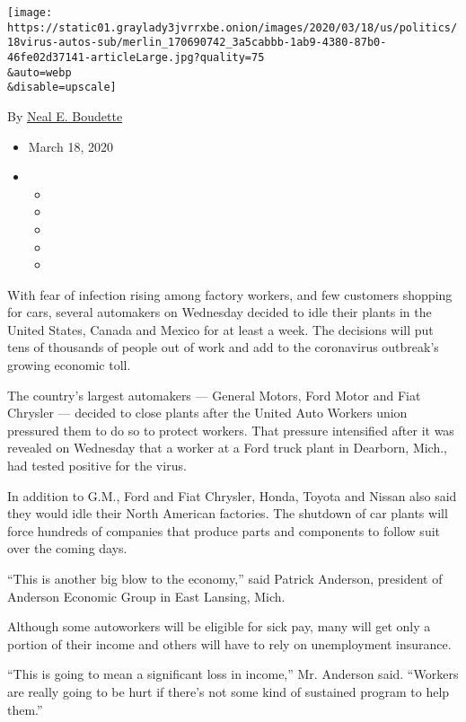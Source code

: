 \texttt{[image: https://static01.graylady3jvrrxbe.onion/images/2020/03/18/us/politics/18virus-autos-sub/merlin\_170690742\_3a5cabbb-1ab9-4380-87b0-46fe02d37141-articleLarge.jpg?quality=75\\\&auto=webp\\\&disable=upscale]}

By \href{https://www.nytimes3xbfgragh.onion/by/neal-e-boudette}{Neal E.
Boudette}

\begin{itemize}
\item
  March 18, 2020
\item
  \begin{itemize}
  \item
  \item
  \item
  \item
  \item
  \end{itemize}
\end{itemize}

With fear of infection rising among factory workers, and few customers
shopping for cars, several automakers on Wednesday decided to idle their
plants in the United States, Canada and Mexico for at least a week. The
decisions will put tens of thousands of people out of work and add to
the coronavirus outbreak's growing economic toll.

The country's largest automakers --- General Motors, Ford Motor and Fiat
Chrysler --- decided to close plants after the United Auto Workers union
pressured them to do so to protect workers. That pressure intensified
after it was revealed on Wednesday that a worker at a Ford truck plant
in Dearborn, Mich., had tested positive for the virus.

In addition to G.M., Ford and Fiat Chrysler, Honda, Toyota and Nissan
also said they would idle their North American factories. The shutdown
of car plants will force hundreds of companies that produce parts and
components to follow suit over the coming days.

``This is another big blow to the economy,'' said Patrick Anderson,
president of Anderson Economic Group in East Lansing, Mich.

Although some autoworkers will be eligible for sick pay, many will get
only a portion of their income and others will have to rely on
unemployment insurance.

``This is going to mean a significant loss in income,'' Mr. Anderson
said. ``Workers are really going to be hurt if there's not some kind of
sustained program to help them.''

